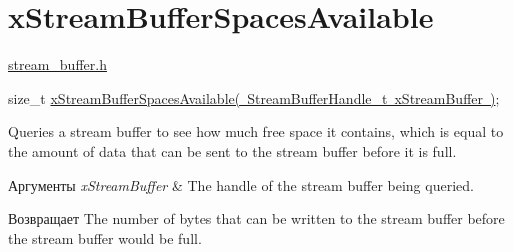 \hypertarget{group__x_stream_buffer_spaces_available}{}\section{x\+Stream\+Buffer\+Spaces\+Available}
\label{group__x_stream_buffer_spaces_available}
\mbox{\hyperlink{stream__buffer_8h}{stream\+\_\+buffer.\+h}}


\begin{DoxyPre}
size\_t \mbox{\hyperlink{stream__buffer_8h_a9a78e0206cb1dc343c329f9db579208d}{xStreamBufferSpacesAvailable( StreamBufferHandle\_t xStreamBuffer )}};
\end{DoxyPre}


Queries a stream buffer to see how much free space it contains, which is equal to the amount of data that can be sent to the stream buffer before it is full.


\begin{DoxyParams}{Аргументы}
{\em x\+Stream\+Buffer} & The handle of the stream buffer being queried.\\
\hline
\end{DoxyParams}
\begin{DoxyReturn}{Возвращает}
The number of bytes that can be written to the stream buffer before the stream buffer would be full. 
\end{DoxyReturn}
